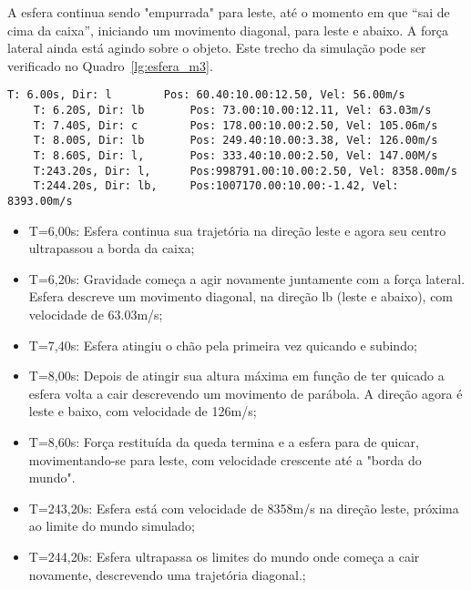 \documentclass[12pt]{article}
\begin{document}
A esfera continua sendo "empurrada" para leste, até o momento em que “sai de cima da caixa”, iniciando um movimento diagonal, para leste e abaixo. A força lateral ainda está agindo sobre o objeto. Este trecho da simulação pode ser verificado no Quadro~\ref{lg:esfera_m3}.

\begin{lstlisting}[frame=single,caption=Registro Acessível: Esfera se movendo diagonalmente\label{lg:esfera_m3}]
	T: 6.00s, Dir: l		Pos: 60.40:10.00:12.50, Vel: 56.00m/s
	T: 6.20S, Dir: lb		Pos: 73.00:10.00:12.11, Vel: 63.03m/s
	T: 7.40S, Dir: c		Pos: 178.00:10.00:2.50, Vel: 105.06m/s
	T: 8.00S, Dir: lb		Pos: 249.40:10.00:3.38, Vel: 126.00m/s
	T: 8.60S, Dir: l,		Pos: 333.40:10.00:2.50, Vel: 147.00M/s
	T:243.20s, Dir: l,  	Pos:998791.00:10.00:2.50, Vel: 8358.00m/s
	T:244.20s, Dir: lb, 	Pos:1007170.00:10.00:-1.42, Vel: 8393.00m/s
\end{lstlisting}

\begin{itemize}
	\item T=6,00s: Esfera continua sua trajetória na direção leste e agora seu centro ultrapassou a borda da caixa;
	
	\item T=6,20s: Gravidade começa a agir novamente juntamente com a força lateral. Esfera descreve um movimento diagonal, na direção lb (leste e abaixo), com velocidade de 63.03m/s;
	
	\item T=7,40s: Esfera atingiu o chão pela primeira vez quicando e subindo;
	
	\item T=8,00s: Depois de atingir sua altura máxima em função de ter quicado a esfera volta a cair descrevendo um movimento de parábola. A direção agora é leste e baixo, com velocidade de 126m/s;
	
	\item T=8,60s: Força restituída da queda termina e a esfera para de quicar, movimentando-se para leste, com velocidade crescente até a "borda do mundo".
	\item T=243,20s: Esfera está com velocidade de 8358m/s na direção leste, próxima ao limite do mundo simulado;
	\item T=244,20s: Esfera ultrapassa os limites do mundo onde começa a cair novamente, descrevendo uma trajetória diagonal.;
\end{itemize}
\end{document}
